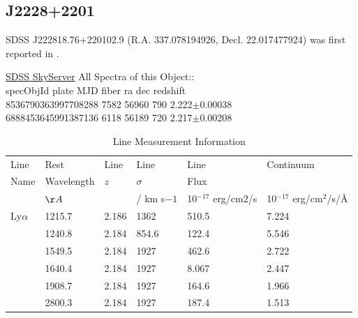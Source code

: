 \documentclass[a4paper,fleqn,usenatbib]{mnras}
\begin{document}
\subsection{J2228+2201}
SDSS J222818.76+220102.9 (R.A. 337.078194926, Decl. 22.017477924) was first reported in 
\citet{Paris2017}. 

\href{skyserver.sdss.org/dr15/en/tools/explore/summary.aspx?id=1237678579819479655}{SDSS SkyServer}
All Spectra of this Object:: \\
specObjId	plate	MJD	fiber	ra	dec	redshift \\
8536790363997708288	7582	56960	790	2.222$\pm$0.00038\\
6888453645991387136	6118	56189	720	2.217$\pm$0.00208\\




\begin{table}
  \centering
  \begin{tabular}{l  l  l    lll}
    \hline \hline 
    Line 	    &   Rest	      & Line       & Line	       &	Line			                 &   Continuum \\ 
    Name	    &   Wavelength  &  $z$       & $\sigma$ 	&	Flux			                 & \\
                    &    $\AA $        &              & /  km s$-1$	&     10$^{-17}$ erg/cm$2$/s &  10$^{-17}$ erg/cm$^2$/s/\AA  \\
Ly$\alpha$  &	 1215.7	&	2.186      &	1362	&	510.5		                &	7.224 \\
\nv		    &   1240.8	&	2.184     &	 854.6	&	122.4	                    	&	5.546 \\ 
\civ		    &  1549.5	&	2.184    &	1927	&	462.6		                &	2.722 \\ 
\heii	    &	 1640.4	&	2.184    &	1927	&    	  8.067	                   	&	2.447 \\  
\ciii 	    &	 1908.7	&	2.184    &	1927	&	164.6	                   	&	1.966  \\ 
\mgii	    &	 2800.3	&	2.184   & 	1927	&	187.4	                   	&	1.513  \\
   \hline \hline   
  \end{tabular}
  \caption{Line Measurement Information}
 \label{tab:line_values}
\end{table}
\end{document}
